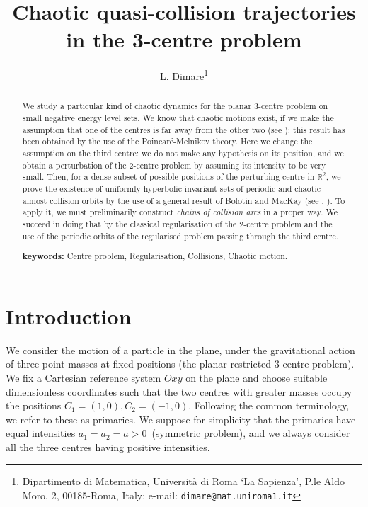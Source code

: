 \documentclass[a4paper]{article}
\begin{document}
\title{Chaotic quasi-collision trajectories in the 3-centre problem}
\author{L. Dimare\footnote{Dipartimento di Matematica, Universit\`a di
    Roma `La Sapienza', P.le Aldo Moro, 2, 00185-Roma, Italy; e-mail:
    {\tt dimare@mat.uniroma1.it} }} 
\date{}

\maketitle 
\begin{abstract}
We study a particular kind of chaotic dynamics for the planar
3-centre problem on small negative energy level sets.
We know that chaotic motions exist, if we make the assumption that one
of the centres is far away from the other two (see \cite{BN2}): this
result has been obtained by the use of the Poincar\'e-Melnikov theory.
Here we change the assumption on the third centre: we do not make any
hypothesis on its position, and we obtain a perturbation of the
2-centre problem by assuming its intensity to be very small. Then, for
a dense subset of possible positions of the perturbing centre in
${\mathbb{R}}^2$, we prove the existence of uniformly hyperbolic invariant sets
of periodic and chaotic almost collision orbits by the use of a
general result of Bolotin and MacKay (see \cite{BM1}, \cite{BM2}).  To
apply it, we must preliminarily construct \emph{chains of collision
  arcs} in a proper way.  We succeed in doing that by the classical
regularisation of the 2-centre problem and the use of the periodic
orbits of the regularised problem passing through the third centre.

\vskip 0.3cm 
\noindent
{\bf keywords:} Centre problem, Regularisation, Collisions,
  Chaotic motion.
\end{abstract}

\section{Introduction}
We consider the motion of a particle in the plane, under the gravitational 
action of three  point masses at fixed positions (the planar restricted 
3-centre problem). We fix a Cartesian reference system $Oxy$ on the plane 
and choose suitable dimensionless coordinates such that the two centres 
with greater masses occupy the positions $C_1=(1,0),C_2=(-1,0)$. Following 
the common terminology, we refer to these as primaries. We suppose for 
simplicity that the primaries have equal intensities 
$a_1=a_2=a>0\,$ (symmetric problem),
and we always consider all the three centres having positive intensities. 
\end{document}
